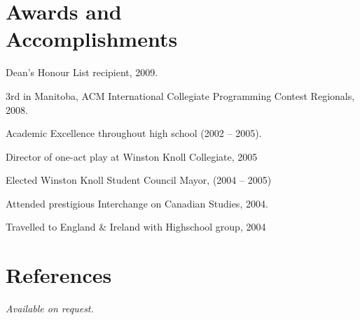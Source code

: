 \documentclass[margin,line,letterpaper]{resume}
\begin{document}
\begin{resume}
  \section{\mysidestyle Awards and\\Accomplishments}

  \begin{list2}
    \item Dean's Honour List recipient, 2009.
    \item 3rd in Manitoba, ACM International Collegiate Programming Contest Regionals, 2008.
    \item Academic Excellence throughout high school (2002 -- 2005).
    \item Director of one-act play at Winston Knoll Collegiate, 2005
    \item Elected Winston Knoll Student Council Mayor, (2004 -- 2005)
    \item Attended prestigious Interchange on Canadian Studies, 2004.
    \item Travelled to England \& Ireland with Highschool group, 2004
  \end{list2}

  \section{\mysidestyle References}

  {\sl Available on request.}

\end{resume}
\end{document}

